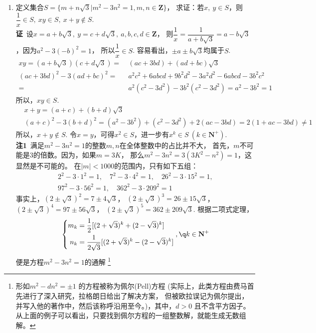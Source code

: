 \begin{enumerate}[label={【\textbf{例\thechapter.\arabic*}】},
 leftmargin=\inteval{\myenumleftmargin}pt,
 itemsep=\inteval{\myenumitempsep}pt,
 itemindent=\inteval{\myenumitemindent}pt]
\item 定义集合$ S=\{m+n\sqrt{3}|m^2-3n^2=1,m,n\in \textbf{Z}\} $，
求证：若$ x,\ y\in S $，则$ \dfrac{1}{x}\in S,\ xy \in　S,\ x+y\notin S $. \\
\textbf{证}\ 设$ x=a+b\sqrt{3},\ y=c+d\sqrt{3},\ a,b,c,d\in \textbf{Z} $，
则$ \dfrac{1}{x}=\dfrac{1}{a+b\sqrt{3}}=a-b\sqrt{3} $，因为$ a^2-3(-b)^2=1 $，
所以$ \dfrac{1}{x}\in S $. 容易看出，$ \pm a \pm b\sqrt{3} $均属于$ S $. 
\begin{align*}
    xy=(a+b\sqrt{3})(c+d\sqrt{3})=&\  (ac+3bd)+(ad+bc)\sqrt{3} \\
    (ac+3bd)^2-3(ad+bc)^2 =&\  a^2c^2+6abcd+9b^2d^2-3a^2d^2-6abcd-3b^2c^2 \\
    =&\  a^2(c^2-3d^2)-3b^2(c^2-3d^2)=a^2-3b^2=1 
\end{align*}
所以，$ xy\in S $.
\begin{align*}
    & x+y=(a+c)+(b+d)\sqrt{3} \\
    & (a+c)^2-3(b+d)^2=(a^2-3b^2)+(c^2-3d^2)+2(ac-3bd)=2(1+ac-3bd)\neq 1
\end{align*}
所以，$ x+y\notin S $. 令$ x=y $，可得$ x^2\in S $，进一步有$ x^k\in S\ 
(k\in \textbf{N}^+) $. \\
\textbf{注1}\ 满足$ m^2-3n^2=1 $的整数$ m,n $在全体整数中的占比并不大，
首先，$ m $不可能是3的倍数。因为，如果$ m=3K $，
那么$ m^2-3n^2=3(3K^2-n^2)=1 $，这显然是不可能的。
在$ |m|<1000 $的范围内，只有如下五组：
\begin{gather*}
    2^2-3\cdot 1^2=1,\quad  7^2-3\cdot 4^2=1,\quad  26^2-3\cdot 15^2=1, \\
    97^2-3\cdot 56^2=1,\quad 362^2-3\cdot 209^2=1
\end{gather*}
事实上，$ (2\pm\sqrt{3})^2=7\pm 4\sqrt{3} $，
$ (2\pm\sqrt{3})^3=26\pm 15\sqrt{3} $，
$ (2\pm\sqrt{3})^4=97\pm 56\sqrt{3} $，
$ (2\pm \sqrt{3})^5=362\pm 209\sqrt{3} $. 
根据二项式定理，
\begin{gather*}
    \left\{ \begin{aligned}
        m_k &=\dfrac{1}{2}[(2+\sqrt{3})^k+(2-\sqrt{3})^k] \\ 
        n_k &=\dfrac{1}{2\sqrt{3}}[(2+\sqrt{3})^k-(2-\sqrt{3})^k]    
    \end{aligned} \right. , \q  k\in \textbf{N}^+
\end{gather*}
便是方程$ m^2-3n^2=1 $的通解
\footnote{形如$ m^2-dn^2=\pm 1 $ 的方程被称为佩尔(Pell)方程
(实际上，此类方程由费马首先进行了深入研究，拉格朗日给出了解决方案，
但被欧拉误记为佩尔提出，并写入他的著作中，然后该称呼沿用至今。)，其中，$ d>0 $
且不含平方因子。从上面的例子可以看出，只要找到佩尔方程的一组整数解，就能生成无数组解。
}
\end{enumerate}

